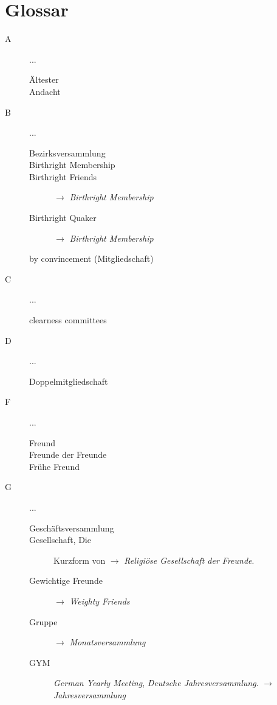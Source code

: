 \chapter{Glossar}
\begin{description}
 \item[A] ...
\begin{description}
 \item[Ältester]
 \item[Andacht]
 \end{description}
 \item[B] ...
\begin{description}
 \item[Bezirksversammlung]
 \item[Birthright Membership]
 \item[Birthright Friends] $\to$ \textit{Birthright Membership}
 \item[Birthright Quaker] $\to$ \textit{Birthright Membership}
 \item[by convincement (Mitgliedschaft)]
 \end{description}
 \item[C]...
\begin{description}
 \item[clearness committees]
 \end{description}
 \item[D]...
\begin{description}
 \item[Doppelmitgliedschaft]
 \end{description}
 \item[F]...
\begin{description}
 \item[Freund]
 \item[Freunde der Freunde]
 \item[Frühe Freund]
 \end{description}
 \item[G]...
\begin{description}
 \item[Geschäftsversammlung]
 \item[Gesellschaft, Die] Kurzform von  $\to$ \textit{Religiöse Gesellschaft der Freunde}.
 \item[Gewichtige Freunde] $\to$ \textit{Weighty Friends}
 \item[Gruppe] $\to$ \textit{Monatsversammlung}
 \item[GYM] \textit{German Yearly Meeting}, \textit{Deutsche Jahresversammlung}. $\to$ \textit{Jahresversammlung}

\end{description}
\end{description}
